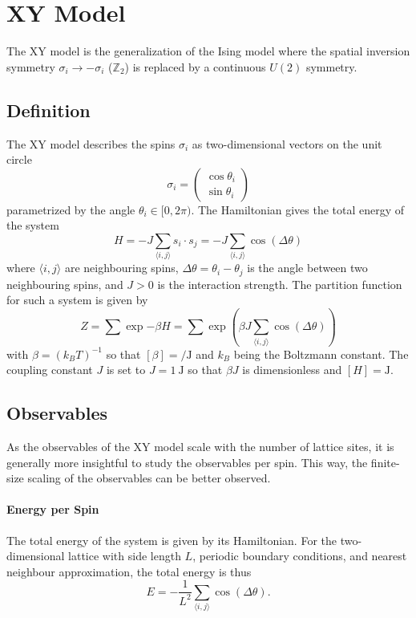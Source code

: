 \section{XY Model}\label{sec:theo:xy_model}
	The XY model is the generalization of the Ising model where the spatial inversion symmetry $\sigma_i \rightarrow -\sigma_i$ ($\mathbb{Z}_2$) is replaced by a continuous $U(2)$ symmetry.
	
	\subsection{Definition}
		The XY model describes the spins $\sigma_i$ as two-dimensional vectors on the unit circle
		\begin{equation}\label{eq:hamiltonian}
			\sigma_i = \begin{pmatrix}
				\cos{\theta_i} \\ \sin{\theta_i}
			\end{pmatrix}
		\end{equation}
		parametrized by the angle $\theta_i \in [0,2\pi)$. The Hamiltonian gives the total energy of the system
		\begin{equation}
			H = -J \sum_{\langle i, j \rangle}{s_i \cdot s_j} = -J \sum_{\langle i, j \rangle}{\cos(\Delta \theta)}
		\end{equation}
		where $\langle i,j \rangle$ are neighbouring spins, $\Delta \theta = \theta_i - \theta_j$ is the angle between two neighbouring spins, and $J>0$ is the interaction strength. The partition function for such a system is given by
		\begin{equation}
			Z = \sum{\exp{-\beta H}} = \sum{\exp{ \left( \beta J \sum_{\langle i, j \rangle}{\cos(\Delta \theta)} \right) }}
		\end{equation}
		with $\beta = (k_B T)^{-1}$ so that $[\beta] = \si{\per\joule}$ and $k_B$ being the Boltzmann constant. The coupling constant $J$ is set to $J = \SI{1}{\joule}$ so that $\beta J$ is dimensionless and $[H] = \si{\joule}$. 
		
	\subsection{Observables}
		As the observables of the XY model scale with the number of lattice sites, it is generally more insightful to study the observables per spin. This way, the finite-size scaling of the observables can be better observed.
	
		\paragraph{Energy per Spin}
			The total energy of the system is given by its Hamiltonian. For the two-dimensional lattice with side length $L$, periodic boundary conditions, and nearest neighbour approximation, the total energy is thus
			\begin{equation}\label{eq:energy}
				E = - \frac{1}{L^2} \sum_{\langle i, j \rangle}{\cos(\Delta \theta)}.
			\end{equation}
		
